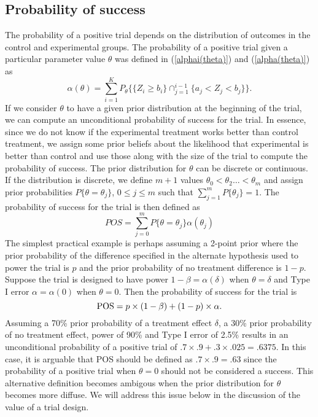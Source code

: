 \subsection{Probability of success}
The probability of a positive trial depends on the distribution of outcomes in the control and experimental groups.
The probability of a positive trial given a particular parameter value $\theta$ was defined in (\ref{alphai(theta)}) and  (\ref{alpha(theta)}) as
\begin{equation}
\alpha(\theta)=\sum_{i=1}^{K}
P_{\theta}\{\{Z_{i}\geq b_{i}\}\cap_{j=1}^{i-1}
\{a_{j}<Z_{j}<b_{j}\}\}.\label{POS(theta)}
\end{equation}
If we consider $\theta$ to have a given prior distribution at the beginning of the trial, we can compute an unconditional probability of success for the trial. 
In essence, since we do not know if the experimental treatment works better than control treatment, we assign some prior beliefs about the likelihood that experimental is better than control and use those along with the size of the trial to compute the probability of success.
The prior distribution for $\theta$ can be discrete or continuous.
If the distribution is discrete, we define $m+1$ values $\theta_0<\theta_2\ldots<\theta_m$ and assign prior probabilities $P\{\theta=\theta_j\}$, $0\leq j\leq m$ such that $\sum_{j=1}^m P\{\theta_j\}=1$. 
The probability of success for the trial is then defined as
\begin{equation}
POS=\sum_{j=0}^m P\{\theta=\theta_j\} \alpha(\theta_j)\label{POS}
\end{equation}
The simplest practical example is perhaps assuming a 2-point prior where the prior probability of the difference specified in the alternate hypothesis used to power the trial is $p$ and the prior probability of no treatment difference is $1-p$. 
Suppose the trial is designed to have power $1-\beta=\alpha(\delta)$ when $\theta=\delta$ and Type I error $\alpha=\alpha(0)$ when $\theta=0$.
Then the probability of success for the trial is
$$\hbox{POS}=p\times (1-\beta) + (1-p) \times \alpha.$$
Assuming a 70\% prior probability of a treatment effect $\delta$, a 30\% prior probability of no treatment effect, power of 90\% and Type I error of 2.5\%  results in an unconditional probability of a positive trial of $.7\times .9 + .3\times .025=.6375$.
In this case, it is arguable that POS should be defined as $.7\times .9=.63$ since the probability of a positive trial when $\theta=0$ should not be considered a success.
This alternative definition becomes ambigous when the prior distribution for $\theta$ becomes more diffuse.
We will address this issue below in the discussion of the value of a trial design.

